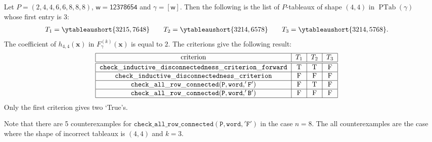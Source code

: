 \documentclass[11pt,reqno]{amsart}
\theoremstyle{definition}
\theoremstyle{remark}
\numberwithin{equation}{section}
\newcommand\xx{\mathbf{x}}
\newcommand\ww{\mathsf{w}}
\newcommand\PTab{\operatorname{PTab}}
\begin{document}
Let \( P= (2, 4, 4, 6, 6, 8, 8, 8) \), \( \ww = \mathsf{12378654} \) and \( \gamma=[\ww] \).
Then the following is the list of \( P \)-tableaux of shape \( (4,4) \) in \( \PTab(\gamma) \)
whose first entry is \( 3 \):
\begin{align*}
  T_1 = \ytableaushort{3215,7648}\qquad
  T_2 = \ytableaushort{3214,6578}\qquad
  T_3 = \ytableaushort{3214,5768}.
\end{align*}
The coefficient of \( h_{4,4}(\xx) \) in \( F_\gamma^{(k)}(\xx) \) is equal to \( 2 \).
The criterions give the following result:
\[
  \begin{tabular}{|c|c|c|c|}
    \hline
    criterion & \( T_1 \) & \( T_2 \) & \( T_3 \) \\
    \hline \hline
    \( \mathtt{check\_inductive\_disconnectedness\_criterion\_forward} \) & T & T & F \\
    \hline
    \( \mathtt{check\_inductive\_disconnectedness\_criterion} \) & F & F & F \\
    \hline
    \( \mathtt{check\_all\_row\_connected(P, word, 'F')} \) & F & T & F \\
    \hline
    \( \mathtt{check\_all\_row\_connected(P, word, 'B')} \) & F & F & F \\
    \hline
  \end{tabular}
\]
Only the first criterion gives two `True's.

Note that there are 5 counterexamples for \( \mathtt{check\_all\_row\_connected(P, word, 'F')} \)
in the case \( n=8 \). The all counterexamples are the case where the shape of incorrect tableaux
is \( (4,4) \) and \( k = 3 \).
\end{document}
